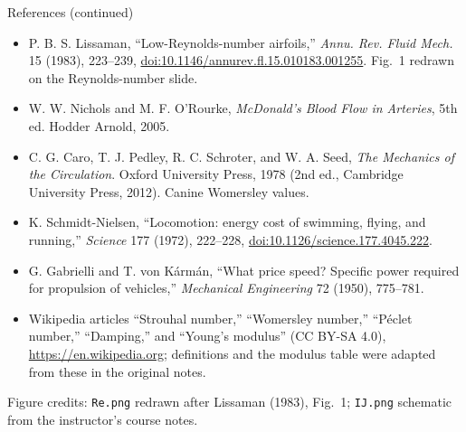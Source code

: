 \documentclass[aspectratio=169,11pt]{beamer}
\begin{document}
\begin{frame}{References (continued)}
\footnotesize
\begin{itemize}\itemsep4pt
  \item P. B. S. Lissaman, ``Low-Reynolds-number airfoils,'' \emph{Annu. Rev. Fluid Mech.} 15 (1983), 223--239,
  \href{https://doi.org/10.1146/annurev.fl.15.010183.001255}{doi:10.1146/annurev.fl.15.010183.001255}. Fig.~1 redrawn on the Reynolds-number slide.
  \item W. W. Nichols and M. F. O'Rourke, \emph{McDonald's Blood Flow in Arteries}, 5th ed. Hodder Arnold, 2005.
  \item C. G. Caro, T. J. Pedley, R. C. Schroter, and W. A. Seed, \emph{The Mechanics of the Circulation}. Oxford University Press, 1978 (2nd ed., Cambridge University Press, 2012). Canine Womersley values.
  \item K. Schmidt-Nielsen, ``Locomotion: energy cost of swimming, flying, and running,'' \emph{Science} 177 (1972), 222--228,
  \href{https://doi.org/10.1126/science.177.4045.222}{doi:10.1126/science.177.4045.222}.
  \item G. Gabrielli and T. von K\'arm\'an, ``What price speed? Specific power required for propulsion of vehicles,'' \emph{Mechanical Engineering} 72 (1950), 775--781.
  \item Wikipedia articles ``Strouhal number,'' ``Womersley number,'' ``P\'eclet number,'' ``Damping,'' and ``Young's modulus'' (CC BY-SA 4.0), \url{https://en.wikipedia.org}; definitions and the modulus table were adapted from these in the original notes.
\end{itemize}
\begin{punchbox}
\small Figure credits: \texttt{Re.png} redrawn after Lissaman (1983), Fig.~1; \texttt{IJ.png} schematic from the instructor's course notes.
\end{punchbox}
\end{frame}
\end{document}
